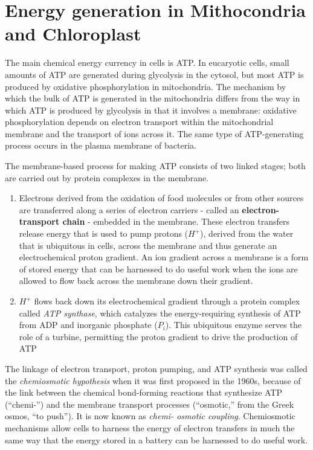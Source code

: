\chapter{Energy generation in Mithocondria and Chloroplast}

The main chemical energy currency in cells is ATP. In
eucaryotic cells, small amounts of ATP are generated during glycolysis
in the cytosol, but most ATP is produced by oxidative phosphorylation
in mitochondria. The mechanism by which
the bulk of ATP is generated in the mitochondria differs from the way
in which ATP is produced by glycolysis in that it involves a membrane:
oxidative phosphorylation depends on electron transport within the mitochondrial
membrane and the transport of ions across it. The same type of
ATP-generating process occurs in the plasma membrane of bacteria.

The membrane-based process for making ATP consists of two linked
stages; both are carried out by protein complexes in the membrane.

\begin{enumerate}
\item Electrons derived from the oxidation of food molecules or from other sources
are transferred along a series of electron carriers - called an
\textbf{electron-transport chain} - embedded in the membrane. These
electron transfers release energy that is used to pump protons
($H^{+}$), derived from the water that is ubiquitous in cells, across
the membrane and thus generate an electrochemical proton
gradient. An ion gradient across a membrane is
a form of stored energy that can be harnessed to do useful work
when the ions are allowed to flow back across the membrane
down their gradient.
\item $H^{+}$ flows back down its electrochemical gradient through a
protein complex called \textit{ATP synthase}, which catalyzes the
energy-requiring synthesis of ATP from ADP and inorganic
phosphate ($P_i$). This ubiquitous enzyme serves the role of a turbine,
permitting the proton gradient to drive the production of ATP
\end{enumerate}

The linkage of electron transport, proton pumping, and ATP synthesis
was called the \textit{chemiosmotic hypothesis} when it was first proposed in the
1960s, because of the link between the chemical bond-forming reactions
that synthesize ATP (“chemi-”) and the membrane transport processes
(“osmotic,” from the Greek osmos, “to push”). It is now known as \textit{chemi-
osmotic coupling}. Chemiosmotic mechanisms allow cells to harness the
energy of electron transfers in much the same way that the energy stored
in a battery can be harnessed to do useful work.

